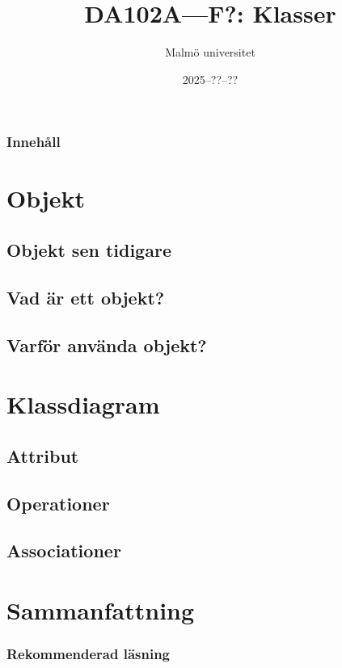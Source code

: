 \documentclass[aspectratio=169]{beamer}
\title{DA102A---F?: Klasser}
\author{Malmö universitet}
\date{2025--??--??}
\institute{Institutionen för datavetenskap och medieteknik}
\begin{document}
\begin{frame}
    \frametitle{Innehåll}

    \tableofcontents

\end{frame}

\section{Objekt}

\subsection{Objekt sen tidigare}


\subsection{Vad är ett objekt?}


\subsection{Varför använda objekt?}


\subsection{}

\section{Klassdiagram}

\subsection{Attribut}

\subsection{Operationer}

\subsection{Associationer}

\section{Sammanfattning}

\begin{frame}
    \frametitle{Rekommenderad läsning}




\end{frame}
\end{document}
